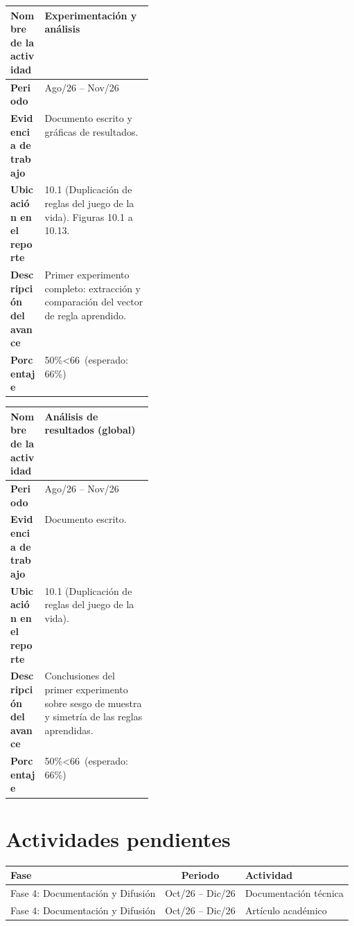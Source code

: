 \documentclass[letterpaper,10pt,oneside]{article}
\def\espExperimentos{66}    \def\realExperimentos{50}
\def\espAnalisis{66}        \def\realAnalisis{50}
\newcommand\porcentaje[2]{#2\%\ifnum#2<#1\ (esperado: #1\%)\fi}
\begin{document}
	\begin{table}[H]
		\centering
		\renewcommand{\arraystretch}{1.25}
		\begin{tabularx}{\linewidth}{|>{\raggedright\bfseries\arraybackslash}p{0.24\linewidth}|X|}
			\hline
			\rowcolor{encabezado}
			Nombre de la actividad & \textbf{Experimentación y análisis} \\ \hline
			Periodo & Ago/26 -- Nov/26 \\ \hline
			Evidencia de trabajo & Documento escrito y gráficas de resultados. \\ \hline
			Ubicación en el reporte & 10.1 (Duplicación de reglas del juego de la vida). Figuras 10.1 a 10.13. \\ \hline
			Descripción del avance & Primer experimento completo: extracción y comparación del vector de regla aprendido. \\ \hline
			Porcentaje & \porcentaje{\espExperimentos}{\realExperimentos} \\ \hline
		\end{tabularx}
	\end{table}

	\begin{table}[H]
		\centering
		\renewcommand{\arraystretch}{1.25}
		\begin{tabularx}{\linewidth}{|>{\raggedright\bfseries\arraybackslash}p{0.24\linewidth}|X|}
			\hline
			\rowcolor{encabezado}
			Nombre de la actividad & \textbf{Análisis de resultados (global)} \\ \hline
			Periodo & Ago/26 -- Nov/26 \\ \hline
			Evidencia de trabajo & Documento escrito. \\ \hline
			Ubicación en el reporte & 10.1 (Duplicación de reglas del juego de la vida). \\ \hline
			Descripción del avance & Conclusiones del primer experimento sobre sesgo de muestra y simetría de las reglas aprendidas. \\ \hline
			Porcentaje & \porcentaje{\espAnalisis}{\realAnalisis} \\ \hline
		\end{tabularx}
	\end{table}

	\section{Actividades pendientes}

	\begin{table}[H]
		\centering
		\renewcommand{\arraystretch}{1.2}
		\begin{tabular}{l c l}
			\toprule
			\textbf{Fase} & \textbf{Periodo} & \textbf{Actividad} \\
			\midrule
			Fase 4: Documentación y Difusión & Oct/26 -- Dic/26 & Documentación técnica \\
			Fase 4: Documentación y Difusión & Oct/26 -- Dic/26 & Artículo académico \\
			\bottomrule
		\end{tabular}
	\end{table}
\end{document}
